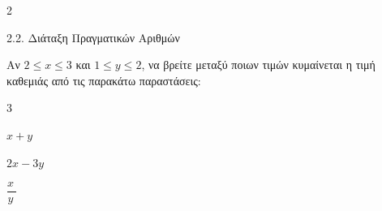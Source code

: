 \begin{ylh}{2}
    \item 2.2. Διάταξη Πραγματικών Αριθμών
\end{ylh}
Αν $2\leq x\leq 3$ και $1 \leq y \leq 2$, να βρείτε μεταξύ ποιων τιμών κυμαίνεται η τιμή καθεμιάς από τις παρακάτω παραστάσεις:
\begin{multicols}{3}
\begin{alist}
\item $x + y$
\item $2x-3y$
\item $\dfrac{x\ }{y\ }$
\end{alist}
\end{multicols}

